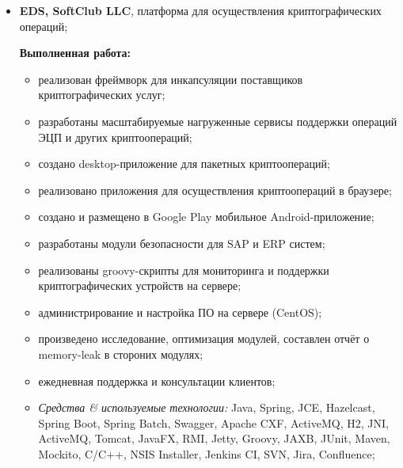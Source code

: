 \documentclass[a4paper, 12pt]{article}
\newcommand{\position}[1]{
    \textbf{#1}}
\newcommand{\itemlabel}[1]{
    \textit{#1:}}
\begin{document}
    \begin{itemize}
        \item \position{EDS, SoftClub LLC}, платформа для осуществления криптографических операций;

            \textbf{Выполненная работа:}
			\begin{itemize}
  				\item реализован фреймворк для инкапсуляции поставщиков криптографических услуг;
  				\item разработаны масштабируемые нагруженные сервисы поддержки операций ЭЦП и других криптоопераций;
				\item создано desktop-приложение для пакетных криптоопераций;
  				\item реализовано приложения для осуществления криптоопераций в браузере;
  				\item создано и размещено в Google Play мобильное Android-приложение;
  				\item разработаны модули безопасности для SAP и ERP систем;
  				\item реализованы groovy-скрипты для мониторинга и поддержки криптографических устройств на сервере;
  				\item администрирование и настройка ПО на сервере (CentOS);
  				\item произведено исследование, оптимизация модулей, составлен отчёт о memory-leak в стороних модулях;
  				\item ежедневная поддержка и консультации клиентов;
			\end{itemize}
	
            \begin{itemize}
                \item \itemlabel{Средства \& используемые технологии} Java, Spring, JCE, Hazelcast, Spring Boot, Spring Batch, Swagger, Apache CXF, ActiveMQ, H2, JNI, ActiveMQ, Tomcat, JavaFX, RMI, Jetty, Groovy, JAXB, JUnit, Maven, Mockito, C/C++, NSIS Installer, Jenkins CI, SVN, Jira, Confluence;
            \end{itemize}
    \end{itemize}  
             
\end{document}

